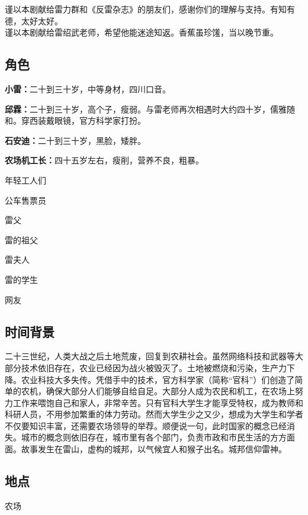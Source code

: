 \documentclass[UTF8,12pt,oneside]{ctexbook}
\begin{document}
        谨以本剧献给雷力群和《反雷杂志》的朋友们，感谢你们的理解与支持。有知有德，太好太好。
        ~\\
        
        谨以本剧献给雷绍武老师，希望他能迷途知返。香蕉虽珍馐，当以晚节重。
        
        \newpage
    
    \normalsize
    
    \subsection{角色}
    \textbf{小雷：}二十到三十岁，中等身材，四川口音。
    
    \textbf{邱霖：}二十到三十岁，高个子，瘦弱。与雷老师再次相遇时大约四十岁，儒雅随和。穿西装戴眼镜，官方科学家打扮。
    
    \textbf{石安迪：}二十到三十岁，黑脸，矮胖。
    
    \textbf{农场机工长：}四十五岁左右，瘦削，营养不良，粗暴。
    
    年轻工人们
    
    公车售票员
    
    雷父
    
    雷的祖父
    
    雷夫人
    
    雷的学生
    
    网友
    
    \subsection{时间背景}
        二十三世纪，人类大战之后土地荒废，回复到农耕社会。虽然网络科技和武器等大部分技术依旧存在，农业已经因为战火被毁灭了。土地被燃烧和污染，生产力下降。农业科技大多失传。凭借手中的技术，官方科学家（简称“官科”）们创造了简单的农机，确保大部分人们能够自给自足。大部分人成为农民和机工，在农场上努力工作来喂饱自己和家人，非常辛苦。只有官科大学生才能享受特权，成为教师和科研人员，不用参加繁重的体力劳动。然而大学生少之又少，想成为大学生和学者不仅要知识丰富，还需要农场领导的举荐。顺便说一句，此时国家的概念已经消失。城市的概念则依旧存在，城市里有各个部门，负责市政和市民生活的方方面面。故事发生在雷山，虚构的城邦，以气候宜人和猴子出名。城邦信仰雷神。
    
    \subsection{地点}
        农场
        
\end{document}

